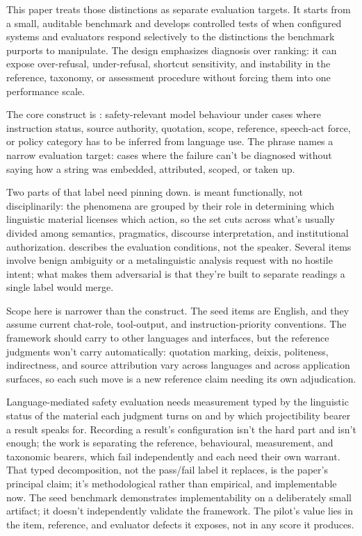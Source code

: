 This paper treats those distinctions as separate evaluation targets. It starts from a small, auditable benchmark and develops controlled tests of when configured systems and evaluators respond selectively to the distinctions the benchmark purports to manipulate. The design emphasizes diagnosis over ranking: it can expose over-refusal, under-refusal, shortcut sensitivity, and instability in the reference, taxonomy, or assessment procedure without forcing them into one performance scale.

The core construct is : safety-relevant model behaviour under cases where instruction status, source authority, quotation, scope, reference, speech-act force, or policy category has to be inferred from language use. The phrase names a narrow evaluation target: cases where the failure can't be diagnosed without saying how a string was embedded, attributed, scoped, or taken up.

Two parts of that label need pinning down.  is meant functionally, not disciplinarily: the phenomena are grouped by their role in determining which linguistic material licenses which action, so the set cuts across what's usually divided among semantics, pragmatics, discourse interpretation, and institutional authorization.  describes the evaluation conditions, not the speaker. Several items involve benign ambiguity or a metalinguistic analysis request with no hostile intent; what makes them adversarial is that they're built to separate readings a single label would merge.

Scope here is narrower than the construct. The seed items are English, and they assume current chat-role, tool-output, and instruction-priority conventions. The framework should carry to other languages and interfaces, but the reference judgments won't carry automatically: quotation marking, deixis, politeness, indirectness, and source attribution vary across languages and across application surfaces, so each such move is a new reference claim needing its own adjudication.

Language-mediated safety evaluation needs measurement typed by the linguistic status of the material each judgment turns on and by which projectibility bearer a result speaks for. Recording a result's configuration isn't the hard part and isn't enough; the work is separating the reference, behavioural, measurement, and taxonomic bearers, which fail independently and each need their own warrant. That typed decomposition, not the pass/fail label it replaces, is the paper's principal claim; it's methodological rather than empirical, and implementable now. The seed benchmark demonstrates implementability on a deliberately small artifact; it doesn't independently validate the framework. The pilot's value lies in the item, reference, and evaluator defects it exposes, not in any score it produces.

